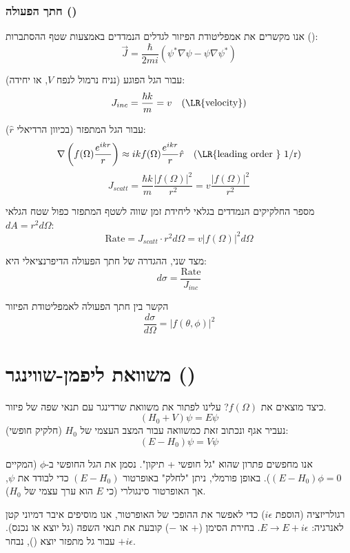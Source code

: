 \subsubsection{חתך הפעולה ()}
אנו מקשרים את אמפליטודת הפיזור לגדלים הנמדדים באמצעות שטף ההסתברות ():
$$ \vec{J} = \frac{\hbar}{2mi} \left( \psi^* \nabla \psi - \psi \nabla \psi^* \right) $$

עבור הגל הפוגע (נניח נרמול לנפח $V$, או יחידה):
$$ J_{inc} = \frac{\hbar k}{m} = v \quad (\text{\LR{velocity}}) $$

עבור הגל המתפזר (בכיוון הרדיאלי $\hat{r}$):
$$ \nabla \left( f(\Omega) \frac{e^{ikr}}{r} \right) \approx ik f(\Omega) \frac{e^{ikr}}{r} \hat{r} \quad (\text{\LR{leading order } 1/r}) $$
$$ J_{scatt} = \frac{\hbar k}{m} \frac{|f(\Omega)|^2}{r^2} = v \frac{|f(\Omega)|^2}{r^2} $$

מספר החלקיקים הנמדדים בגלאי ליחידת זמן שווה לשטף המתפזר כפול שטח הגלאי $dA = r^2 d\Omega$:
$$ \text{Rate} = J_{scatt} \cdot r^2 d\Omega = v |f(\Omega)|^2 d\Omega $$

מצד שני, ההגדרה של חתך הפעולה הדיפרנציאלי היא:
$$ d\sigma = \frac{\text{Rate}}{J_{inc}} $$

\begin{resultbox}{הקשר בין חתך הפעולה לאמפליטודת הפיזור}
$$ \frac{d\sigma}{d\Omega} = |f(\theta, \phi)|^2 $$
\end{resultbox}

\section{משוואת ליפמן-שווינגר ()}

כיצד מוצאים את $f(\Omega)$? עלינו לפתור את משוואת שרדינגר עם תנאי שפה של פיזור.
$$ (H_0 + V) \psi = E \psi $$
נעביר אגף ונכתוב זאת כמשוואה עבור המצב העצמי של $H_0$ (חלקיק חופשי):
$$ (E - H_0) \psi = V \psi $$

אנו מחפשים פתרון שהוא "גל חופשי + תיקון". נסמן את הגל החופשי ב-$\phi$ (המקיים $(E-H_0)\phi = 0$). באופן פורמלי, ניתן "לחלק" באופרטור $(E-H_0)$ כדי לבודד את $\psi$, אך האופרטור סינגולרי (כי $E$ הוא ערך עצמי של $H_0$).

\begin{importantbox}{רגולריזציה (הוספת $i\epsilon$)}
כדי לאפשר את ההופכי של האופרטור, אנו מוסיפים איבר דמיוני קטן לאנרגיה: $E \to E + i\epsilon$. בחירת הסימן ($+$ או $-$) קובעת את תנאי השפה (גל יוצא או נכנס). עבור גל מתפזר יוצא (), נבחר $+i\epsilon$.
\end{importantbox}

